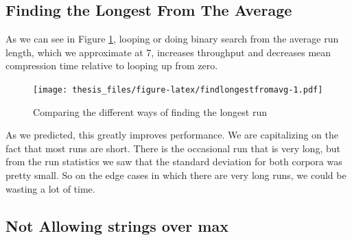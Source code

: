 \documentclass[12pt,twoside]{reedthesis}
\begin{document}
\hypertarget{finding-the-longest-from-the-average}{%
\subsection{Finding the Longest From The Average}\label{finding-the-longest-from-the-average}}

As we can see in Figure \ref{fig:findlongestfromavg}, looping or doing binary search from the average run length, which we approximate at 7, increases throughput and decreases mean compression time relative to looping up from zero.
\begin{figure}
\centering
\texttt{[image: thesis\_files/figure-latex/findlongestfromavg-1.pdf]}
\caption{\label{fig:findlongestfromavg}Comparing the different ways of finding the longest run}
\end{figure}
As we predicted, this greatly improves performance. We are capitalizing on the fact that most runs are short. There is the occasional run that is very long, but from the run statistics we saw that the standard deviation for both corpora was pretty small. So on the edge cases in which there are very long runs, we could be wasting a lot of time.

\hypertarget{not-allowing-strings-over-max}{%
\subsection{Not Allowing strings over max}\label{not-allowing-strings-over-max}}
\end{document}
